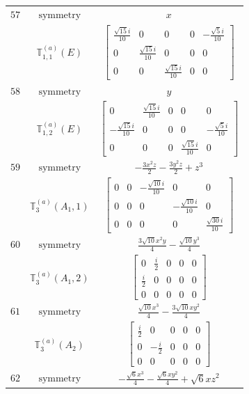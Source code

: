 \documentclass[fleqn,8pt,landscape]{jsarticle}
\begin{document}
\begin{longtable}{ccc}
$ 57 $ & $ \text{symmetry} $ & $ x $ \\
$  $ & $ \mathbb{T}_{1,1}^{(a)}(E) $ & $ \begin{bmatrix} \frac{\sqrt{15} i}{10} & 0 & 0 & 0 & - \frac{\sqrt{5} i}{10} \\ 0 & \frac{\sqrt{15} i}{10} & 0 & 0 & 0 \\ 0 & 0 & \frac{\sqrt{15} i}{10} & 0 & 0 \end{bmatrix} $ \\ \hline
$ 58 $ & $ \text{symmetry} $ & $ y $ \\
$  $ & $ \mathbb{T}_{1,2}^{(a)}(E) $ & $ \begin{bmatrix} 0 & \frac{\sqrt{15} i}{10} & 0 & 0 & 0 \\ - \frac{\sqrt{15} i}{10} & 0 & 0 & 0 & - \frac{\sqrt{5} i}{10} \\ 0 & 0 & 0 & \frac{\sqrt{15} i}{10} & 0 \end{bmatrix} $ \\ \hline
$ 59 $ & $ \text{symmetry} $ & $ - \frac{3 x^{2} z}{2} - \frac{3 y^{2} z}{2} + z^{3} $ \\
$  $ & $ \mathbb{T}_{3}^{(a)}(A_{1},1) $ & $ \begin{bmatrix} 0 & 0 & - \frac{\sqrt{10} i}{10} & 0 & 0 \\ 0 & 0 & 0 & - \frac{\sqrt{10} i}{10} & 0 \\ 0 & 0 & 0 & 0 & \frac{\sqrt{30} i}{10} \end{bmatrix} $ \\ \hline
$ 60 $ & $ \text{symmetry} $ & $ \frac{3 \sqrt{10} x^{2} y}{4} - \frac{\sqrt{10} y^{3}}{4} $ \\
$  $ & $ \mathbb{T}_{3}^{(a)}(A_{1},2) $ & $ \begin{bmatrix} 0 & \frac{i}{2} & 0 & 0 & 0 \\ \frac{i}{2} & 0 & 0 & 0 & 0 \\ 0 & 0 & 0 & 0 & 0 \end{bmatrix} $ \\ \hline
$ 61 $ & $ \text{symmetry} $ & $ \frac{\sqrt{10} x^{3}}{4} - \frac{3 \sqrt{10} x y^{2}}{4} $ \\
$  $ & $ \mathbb{T}_{3}^{(a)}(A_{2}) $ & $ \begin{bmatrix} \frac{i}{2} & 0 & 0 & 0 & 0 \\ 0 & - \frac{i}{2} & 0 & 0 & 0 \\ 0 & 0 & 0 & 0 & 0 \end{bmatrix} $ \\ \hline
$ 62 $ & $ \text{symmetry} $ & $ - \frac{\sqrt{6} x^{3}}{4} - \frac{\sqrt{6} x y^{2}}{4} + \sqrt{6} x z^{2} $ \\

\end{longtable}
\end{document}
